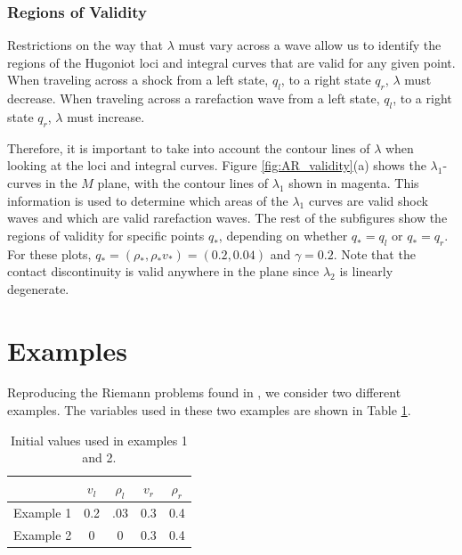 \documentclass{article}
\begin{document}
\subsubsection{Regions of Validity}
Restrictions on the way that $\lambda$ must vary across a wave allow us to identify the regions of the Hugoniot loci and integral curves that are valid for any given point. When traveling across a shock from a left state, $q_l$, to a right state $q_r$, $\lambda$ must decrease. When traveling across a rarefaction wave from a left state, $q_l$, to a right state $q_r$, $\lambda$ must increase. 

Therefore, it is important to take into account the contour lines of $\lambda$ when 
looking at the loci and integral curves. Figure \ref{fig:AR_validity}(a) 
shows the $\lambda_1$-curves in the $M$ plane,
with the contour lines of $\lambda_1$ shown in magenta. This information is used
to determine which areas of the $\lambda_1$ curves are valid shock waves and which
are valid rarefaction waves. The rest of the subfigures show the regions of validity for 
specific points $q_*$, depending on whether $q_* = q_l$ or $q_* = q_r$. For these plots,
$q_* = (\rho_*,\rho_*v_*) = (0.2, 0.04)$ and $\gamma = 0.2$. Note that the contact discontinuity is valid
anywhere in the plane since $\lambda_2$ is linearly degenerate.

\section{Examples}

Reproducing the Riemann problems found in \cite{AwRascle2000}, we consider two different examples. The variables used in these two examples are shown in Table \ref{table:1}.

\vspace{-2ex}
\begin{table}[H]
\caption{Initial values used in examples 1 and 2.}
\begin{center}
\begin{tabular}{| c | c c  c c|}
\hline
& $v_l$ & $\rho_l $ & $v_r$ & $\rho_r $\\
\hline
Example 1 & 0.2 & .03 & 0.3 & 0.4 \\
Example 2 & 0 & 0 & 0.3 & 0.4\\
\hline
\end{tabular}
\end{center}
 \label{table:1}
\end{table}
\end{document}

